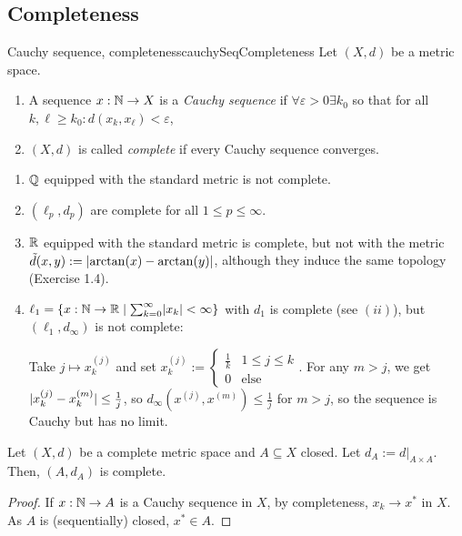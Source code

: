 \documentclass[language=english]{../../Template/TemplateLecture}
\begin{document}
\subsection{Completeness}

\begin{defi}{Cauchy sequence, completeness}{cauchySeqCompleteness}
    Let $(X,d)$ be a metric space.
    \begin{enumerate}[$(i)$]
        \item A sequence $x: \mathbb{N} \to X$ is a \emph{Cauchy sequence} if $\forall \varepsilon > 0 \exists k_0$ so that for all $k, \ell \geq k_0: d(x_k, x_\ell) < \varepsilon$,
        \item $(X,d)$ is called \emph{complete} if every Cauchy sequence converges.
    \end{enumerate}
\end{defi}

\begin{beispiel}\leavevmode
    \begin{enumerate}[$(i)$]
        \item $\mathbb{Q}$ equipped with the standard metric is not complete.
        \item $(\ell_p, d_p)$ are complete for all $1 \leq p \leq \infty$.
        \item $\mathbb{R}$ equipped with the standard metric is complete, but not with the metric $\tilde{d}(x,y) := \lvert\arctan(x) - \arctan(y)\rvert$, although they induce the same topology (Exercise 1.4).
        \item $\ell_1 = \{x: \mathbb{N} \to \mathbb{R} \mid \sum_{k = 0}^\infty \lvert x_k\rvert < \infty\}$ with $d_1$ is complete (see $(ii)$), but $(\ell_1, d_\infty)$ is not complete:
        
        Take $j \mapsto x_k^{(j)}$ and set $x_k^{(j)} := \begin{cases}
            \frac{1}{k} & 1 \leq j \leq k \\
            0 & \text{else}
        \end{cases}$. For any $m > j$, we get $\lvert x_k^{(j)} - x_k^{(m)}\rvert \leq \frac{1}{j}$, so $d_\infty(x^{(j)},x^{(m)}) \leq \frac{1}{j}$ for $m > j$, so the sequence is Cauchy but has no limit. 
    \end{enumerate}
\end{beispiel}

\begin{prop}
    Let $(X,d)$ be a complete metric space and $A \subseteq X$ closed. Let $d_A := d|_{A \times A}$. Then, $(A, d_A)$ is complete.
\end{prop}
\begin{proof}
    If $x: \mathbb{N} \to A$ is a Cauchy sequence in $X$, by completeness, $x_k \to x^*$ in $X$. As $A$ is (sequentially) closed, $x^* \in A$.
\end{proof}
\end{document}
